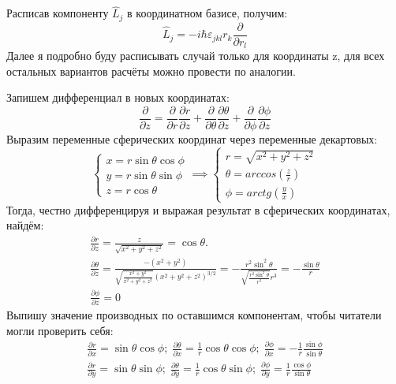 Расписав компоненту $\hat{L}_j$ в координатном базисе, получим: 
\[
\hat{L}_j = -i\hbar\varepsilon_{jkl}r_k\frac{\partial}{\partial r_l}
\]
Далее я подробно буду расписывать случай только для координаты z, для всех остальных вариантов расчёты можно провести по аналогии. 

Запишем дифференциал в новых координатах:
\[
\frac{\partial }{\partial z} = \frac{\partial}{\partial r}\frac{\partial r}{\partial z} + \frac{\partial}{\partial \theta}\frac{\partial \theta}{\partial z} + \frac{\partial}{\partial \phi}\frac{\partial \phi}{\partial z}
\]
Выразим переменные сферических координат через переменные декартовых:
\begin{equation*}
    \begin{cases}
        x = r\sin\theta\cos\phi\\
        y = r\sin\theta\sin\phi\\
        z = r\cos\theta
    \end{cases}
    \implies
    \begin{cases}
        r = \sqrt{x^2 + y^2 + z^2}\\
        \theta = arccos(\frac{z}{r})\\
        \phi = arctg(\frac{y}{x})
    \end{cases}
\end{equation*}
Тогда, честно дифференцируя и выражая результат в сферических координатах, найдём:
\begin{gather*}
\frac{\partial r}{\partial z} = \frac{z}{\sqrt{x^2 + y^2 + z^2}} = \cos\theta.\\
\frac{\partial \theta}{\partial z} = \frac{-(x^2+y^2)}{\sqrt{\frac{x^2 + y^2}{x^2+y^2+z^2}}(x^2+y^2+z^2)^{3/2}}= -\frac{r^2\sin^2\theta}{\sqrt{\frac{r^2\sin^2\theta}{r^2}}r^3} = -\frac{\sin\theta}{r} \\
\frac{\partial \phi}{\partial z} = 0
\end{gather*}
Выпишу значение производных по оставшимся компонентам, чтобы читатели могли проверить себя:
\begin{gather*}
\frac{\partial r}{\partial x} = \sin\theta\cos\phi; \; \frac{\partial \theta}{\partial x} = \frac{1}{r}\cos\theta\cos\phi; \; \frac{\partial \phi}{\partial x} = -\frac{1}{r}\frac{\sin\phi}{\sin\theta}\\
\frac{\partial r}{\partial y} = \sin\theta\sin\phi; \; \frac{\partial \theta}{\partial y} = \frac{1}{r}\cos\theta\sin\phi; \; \frac{\partial \phi}{\partial y} = \frac{1}{r}\frac{\cos\phi}{\sin\theta}
\end{gather*}

